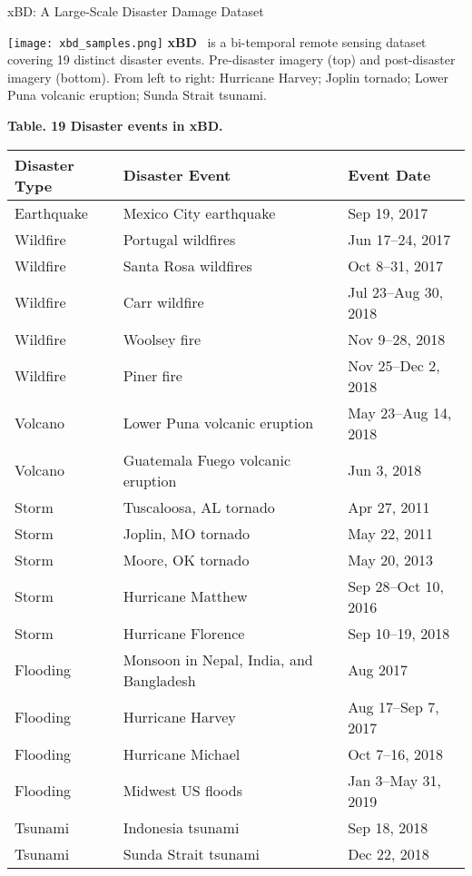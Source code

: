   \begin{refsection}
    \begin{frame}{xBD: A Large-Scale Disaster Damage Dataset}
      \begin{minipage}{0.42\linewidth}
        \centering
        \texttt{[image: xbd\_samples.png]}
        \vspace{0.5em}
        \scriptsize
        \textbf{xBD}~\parencite{guptaCreatingXBDDataset2019} is a bi-temporal remote sensing dataset covering 19 distinct disaster events. Pre-disaster imagery (top) and post-disaster imagery (bottom). From left to right: Hurricane Harvey; Joplin tornado; Lower Puna volcanic eruption; Sunda Strait tsunami.
      \end{minipage}%
      \hfill
      \begin{minipage}{0.55\linewidth}
        \tiny
        \centering
        \textbf{Table. 19 Disaster events in xBD.}
        \begin{tabular}{lll}
          \hline
          \textbf{Disaster Type} & \textbf{Disaster Event} & \textbf{Event Date} \\
          \hline
          Earthquake & Mexico City earthquake & Sep 19, 2017 \\
          Wildfire & Portugal wildfires & Jun 17--24, 2017 \\
          Wildfire & Santa Rosa wildfires & Oct 8--31, 2017 \\
          Wildfire & Carr wildfire & Jul 23--Aug 30, 2018 \\
          Wildfire & Woolsey fire & Nov 9--28, 2018 \\
          Wildfire & Piner fire & Nov 25--Dec 2, 2018 \\
          Volcano & Lower Puna volcanic eruption & May 23--Aug 14, 2018 \\
          Volcano & Guatemala Fuego volcanic eruption & Jun 3, 2018 \\
          Storm & Tuscaloosa, AL tornado & Apr 27, 2011 \\
          Storm & Joplin, MO tornado & May 22, 2011 \\
          Storm & Moore, OK tornado & May 20, 2013 \\
          Storm & Hurricane Matthew & Sep 28--Oct 10, 2016 \\
          Storm & Hurricane Florence & Sep 10--19, 2018 \\
          Flooding & Monsoon in Nepal, India, and Bangladesh & Aug 2017 \\
          Flooding & Hurricane Harvey & Aug 17--Sep 7, 2017 \\
          Flooding & Hurricane Michael & Oct 7--16, 2018 \\
          Flooding & Midwest US floods & Jan 3--May 31, 2019 \\
          Tsunami & Indonesia tsunami & Sep 18, 2018 \\
          Tsunami & Sunda Strait tsunami & Dec 22, 2018 \\
          \hline
        \end{tabular}
        \vspace{0.5em}
  

\end{minipage}
\end{frame}
\end{refsection}
